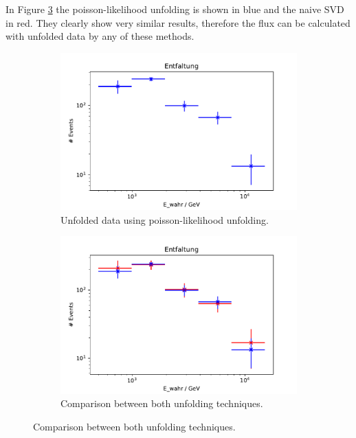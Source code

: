 In Figure \ref{fig:vgl} the poisson-likelihood unfolding
is shown in blue and the naive SVD in red.
They clearly show very similar results, therefore the flux
can be calculated with unfolded data by any of these methods.

\begin{figure}[H]
\centering
\begin{subfigure}{0.45\textwidth}
  \includegraphics[width=\textwidth]{plots/Entfaltung_2.pdf}
  \caption{Unfolded data using poisson-likelihood unfolding.\label{fig:pois}}
\end{subfigure}
\begin{subfigure}{0.45\textwidth}
  \includegraphics[width=\textwidth]{plots/Entfaltung_vgl.pdf}
  \caption{Comparison between both unfolding techniques.\label{fig:vgl}}
\end{subfigure}
\end{figure}

